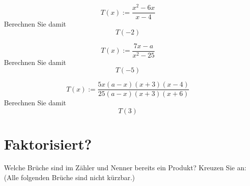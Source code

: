 \nextBbwAufgabenNummer{}
\begin{bbwAufgabenBlock}
\item $$T(x) := \frac{x^2-6x}{x-4}$$
Berechnen Sie damit
$$T(-2)$$

\item $$T(x):=\frac{7x-a}{x^2-25}$$
Berechnen Sie damit
$$T(-5)$$

\item $$T(x):= \frac{5x(a-x)(x+3)(x-4)}{25(a-x)(x+3)(x+6)}$$
Berechnen Sie damit
$$T(3)$$
\end{bbwAufgabenBlock}

\newpage
\section{Faktorisiert?}

Welche Brüche sind im Zähler und Nenner bereits ein Produkt? Kreuzen Sie an:
(Alle folgenden Brüche sind nicht kürzbar.)

\newcommand{\BoxTT}{\TRAINER{\fbox{\color{green} x}}\noTRAINER{\Box}}


